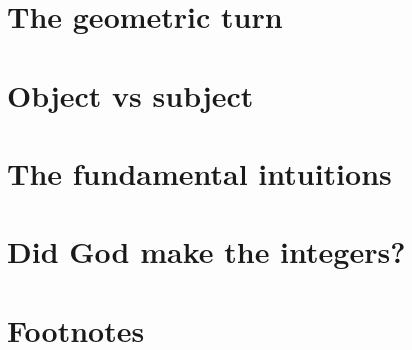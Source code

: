 \documentclass{article}
\begin{document}
\section{The geometric turn}


\section{Object vs subject}
\section{The fundamental intuitions}
\section{Did God make the integers?}
\section*{Footnotes}
\end{document}
